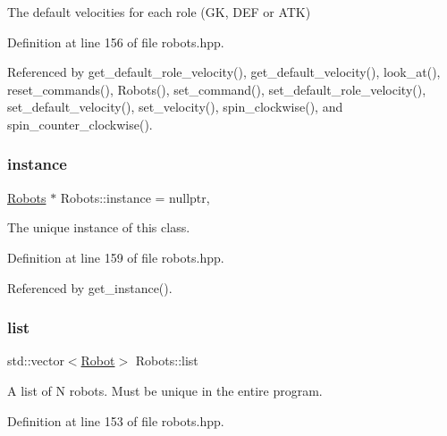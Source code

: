 The default velocities for each role (GK, D\+EF or A\+TK) 



Definition at line 156 of file robots.\+hpp.



Referenced by get\+\_\+default\+\_\+role\+\_\+velocity(), get\+\_\+default\+\_\+velocity(), look\+\_\+at(), reset\+\_\+commands(), Robots(), set\+\_\+command(), set\+\_\+default\+\_\+role\+\_\+velocity(), set\+\_\+default\+\_\+velocity(), set\+\_\+velocity(), spin\+\_\+clockwise(), and spin\+\_\+counter\+\_\+clockwise().

\mbox{\label{class_robots_acd8ab9afe75178be7d696cf2c1b96056}} 
\subsubsection{\texorpdfstring{instance}{instance}}
{\footnotesize\ttfamily \hyperlink{class_robots}{Robots} $\ast$ Robots\+::instance = nullptr\hspace{0.3cm}{\ttfamily [static]}, {\ttfamily [private]}}



The unique instance of this class. 



Definition at line 159 of file robots.\+hpp.



Referenced by get\+\_\+instance().

\mbox{\label{class_robots_a2c6b77265028f82a4342ca1ef15ed305}} 
\subsubsection{\texorpdfstring{list}{list}}
{\footnotesize\ttfamily std\+::vector$<$\hyperlink{struct_robots_1_1_robot}{Robot}$>$ Robots\+::list\hspace{0.3cm}{\ttfamily [private]}}



A list of N robots. Must be unique in the entire program. 



Definition at line 153 of file robots.\+hpp.



